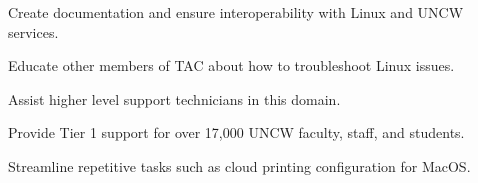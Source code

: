 \begin{cventries}
{\begin{cvsubentries}
        {
          \begin{cvsubitems}
            \item {Create documentation and ensure interoperability with Linux and UNCW services.}
            \item {Educate other members of TAC about how to troubleshoot Linux issues.}
            \item {Assist higher level support technicians in this domain.}
          \end{cvsubitems}
        }
        {
          \begin{cvsubitems}
            \item {Provide Tier 1 support for over 17,000 UNCW faculty, staff, and students.}
            \item {Streamline repetitive tasks such as cloud printing configuration for MacOS.}
          \end{cvsubitems}
        }
      \end{cvsubentries}
    }

\end{cventries}
